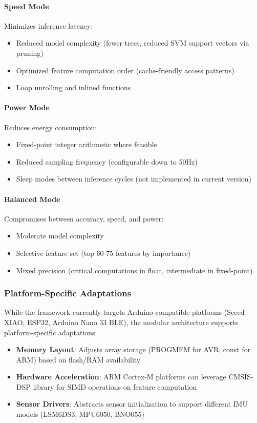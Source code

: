 \paragraph{Speed Mode}
Minimizes inference latency:
\begin{itemize}
    \item Reduced model complexity (fewer trees, reduced SVM support vectors via pruning)
    \item Optimized feature computation order (cache-friendly access patterns)
    \item Loop unrolling and inlined functions
\end{itemize}

\paragraph{Power Mode}
Reduces energy consumption:
\begin{itemize}
    \item Fixed-point integer arithmetic where feasible
    \item Reduced sampling frequency (configurable down to 50Hz)
    \item Sleep modes between inference cycles (not implemented in current version)
\end{itemize}

\paragraph{Balanced Mode}
Compromises between accuracy, speed, and power:
\begin{itemize}
    \item Moderate model complexity
    \item Selective feature set (top 60-75 features by importance)
    \item Mixed precision (critical computations in float, intermediate in fixed-point)
\end{itemize}

\subsubsection{Platform-Specific Adaptations}
While the framework currently targets Arduino-compatible platforms (Seeed XIAO, ESP32, Arduino Nano 33 BLE), the modular architecture supports platform-specific adaptations:
\begin{itemize}
    \item \textbf{Memory Layout}: Adjusts array storage (PROGMEM for AVR, const for ARM) based on flash/RAM availability
    \item \textbf{Hardware Acceleration}: ARM Cortex-M platforms can leverage CMSIS-DSP library for SIMD operations on feature computation
    \item \textbf{Sensor Drivers}: Abstracts sensor initialization to support different IMU models (LSM6DS3, MPU6050, BNO055)
\end{itemize}

